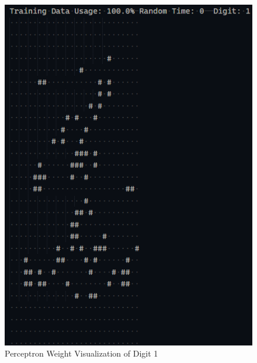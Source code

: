 \documentclass[11pt]{article}
\begin{document}
		\begin{figure}[H]
			\centering
			\includegraphics[scale=0.3]{Weight Visualization Digit 1.jpg}
			\caption{Perceptron Weight Visualization of Digit 1}\label{fig:1}
		\end{figure}
\end{document}
